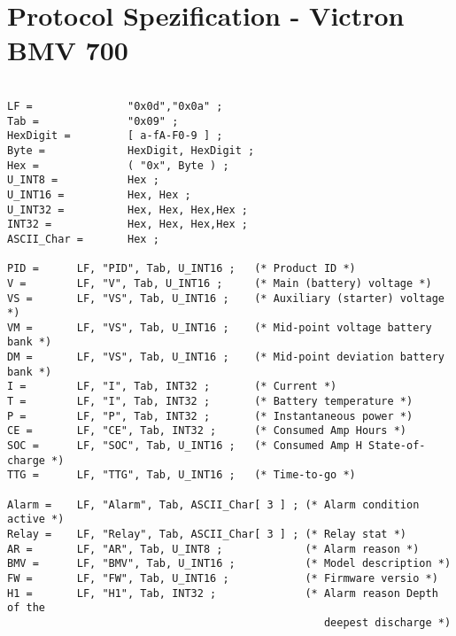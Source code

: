 \section{Protocol Spezification - Victron BMV 700}
\label{VICTRONBMV700EBNF}

\begin{verbatim}

LF =               "0x0d","0x0a" ;
Tab =              "0x09" ;
HexDigit =         [ a-fA-F0-9 ] ;
Byte =             HexDigit, HexDigit ;
Hex =              ( "0x", Byte ) ;
U_INT8 =           Hex ;
U_INT16 =          Hex, Hex ;
U_INT32 =          Hex, Hex, Hex,Hex ;
INT32 =            Hex, Hex, Hex,Hex ;
ASCII_Char =       Hex ;

PID =      LF, "PID", Tab, U_INT16 ;   (* Product ID *)
V =        LF, "V", Tab, U_INT16 ;     (* Main (battery) voltage *)
VS =       LF, "VS", Tab, U_INT16 ;    (* Auxiliary (starter) voltage *)
VM =       LF, "VS", Tab, U_INT16 ;    (* Mid-point voltage battery bank *)
DM =       LF, "VS", Tab, U_INT16 ;    (* Mid-point deviation battery bank *)
I =        LF, "I", Tab, INT32 ;       (* Current *)
T =        LF, "I", Tab, INT32 ;       (* Battery temperature *)
P =        LF, "P", Tab, INT32 ;       (* Instantaneous power *)
CE =       LF, "CE", Tab, INT32 ;      (* Consumed Amp Hours *)
SOC =      LF, "SOC", Tab, U_INT16 ;   (* Consumed Amp H State-of-charge *)
TTG =      LF, "TTG", Tab, U_INT16 ;   (* Time-to-go *)

Alarm =    LF, "Alarm", Tab, ASCII_Char[ 3 ] ; (* Alarm condition active *)
Relay =    LF, "Relay", Tab, ASCII_Char[ 3 ] ; (* Relay stat *)
AR =       LF, "AR", Tab, U_INT8 ;             (* Alarm reason *)
BMV =      LF, "BMV", Tab, U_INT16 ;           (* Model description *)
FW =       LF, "FW", Tab, U_INT16 ;            (* Firmware versio *)
H1 =       LF, "H1", Tab, INT32 ;              (* Alarm reason Depth of the 
                                                  deepest discharge *)
                                                  

\end{verbatim}
